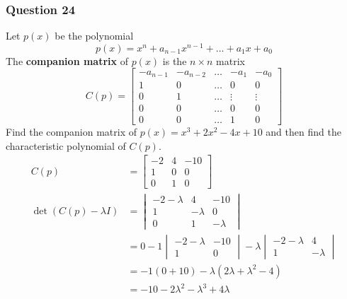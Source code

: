 \documentclass{math}
\begin{document}
\subsubsection*{Question 24}
Let \( p(x) \) be the polynomial
\[ p(x) = x^n+a_{n-1}x^{n-1}+\dots+a_{1}x+a_0 \]
The \textbf{companion matrix} of \( p(x) \) is the \( n\times n \) matrix
\[ C(p) = \begin{bmatrix}
  -a_{n-1} & -a_{n-2} & \dots & -a_1 & -a_0 \\
  1 & 0 & \dots & 0 & 0 \\
  0 & 1 & \dots & \vdots & \vdots \\
  0 & 0 & \dots & 0 & 0 \\
  0 & 0 & \dots & 1 & 0
\end{bmatrix} \]
Find the companion matrix of \( p(x) = x^3+2x^2-4x+10 \) and then find the
characteristic polynomial of \( C(p) \).
\begin{align*}
  C(p) &= \begin{bmatrix}
    -2 & 4 & -10 \\
    1 & 0 & 0 \\
    0 & 1 & 0
  \end{bmatrix} \\
  \det(C(p)-\lambda I) &= \begin{vmatrix}
    -2-\lambda & 4 & -10 \\
    1 & -\lambda & 0 \\
    0 & 1 & -\lambda
  \end{vmatrix} \\
  &= 0-1\begin{vmatrix}
    -2-\lambda & -10 \\
    1 & 0
  \end{vmatrix}-\lambda\begin{vmatrix}
    -2-\lambda & 4 \\
    1 & -\lambda
  \end{vmatrix} \\
  &= -1(0+10)-\lambda(2\lambda+\lambda^2-4) \\
  &= -10-2\lambda^2-\lambda^3+4\lambda
\end{align*}
\end{document}
